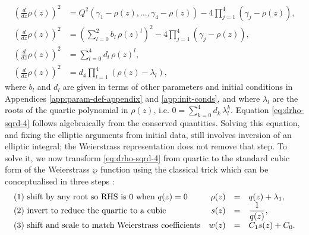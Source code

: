 \documentclass[11pt,a4paper]{article}
\numberwithin{equation}{section}
\begin{document}
\begin{align}
\left(\frac{d}{d z} \rho{\left(z \right)}\right)^{2} &= Q^{2}{\left({\gamma}_{1} - \rho{\left(z \right)}, \dots, {\gamma}_{4}  - \rho{\left(z \right)}\right)} - 4 \prod_{j=1}^{4} \left({\gamma}_{j} - \rho{\left(z \right)}\right), \label{eq:drho-sqrd-1} \\
\left(\frac{d}{d z} \rho{\left(z \right)}\right)^{2} &=  \left(\sum_{l=0}^{2}b_l\,\rho\left(z\right)^l\right)^{2} - 4 \prod_{j=1}^{4} \left({\gamma}_{j} - \rho{\left(z \right)}\right), \label{eq:drho-sqrd-2} \\
\left(\frac{d}{d z} \rho{\left(z \right)}\right)^{2} &= \sum_{l=0}^{4}d_l\,\rho\left(z\right)^l, \label{eq:drho-sqrd-3} \\
\left(\frac{d}{d z} \rho{\left(z \right)}\right)^{2} &= d_4 \prod_{l=1}^{4} \left(\rho\left(z\right) -  \lambda_l\right), \label{eq:drho-sqrd-4}
\end{align}
where $b_l$ and $d_l$ are given in terms of other parameters and initial conditions in Appendices \ref{app:param-def-appendix} and \ref{app:init-conds}, and where $\lambda_l$ are the roots of the quartic polynomial in $\rho(z)$, i.e. $0=\sum_{k=0}^{4}d_k\,\lambda_{l}^k$.
Equation \eqref{eq:drho-sqrd-4} follows algebraically from the conserved quantities.
Solving this equation, and fixing the elliptic arguments from initial data, still involves inversion of an elliptic integral; the Weierstrass representation does not remove that step.
To solve it, we now transform \eqref{eq:drho-sqrd-4} from quartic to the standard cubic form of the Weierstrass $\wp$ function using the classical trick which can be conceptualised in three steps \cite{whittakerCourseModernAnalysis2021}:
\begin{equation}
\label{eq:wp-4-to-3}
\begin{array}{l rcl}
\text{(1) shift by any root so RHS is 0 when $q(z)=0$}
& \rho(z) &=& q(z) + \lambda_1,\\
\text{(2) invert to reduce the quartic to a cubic}
& s(z) &=& \dfrac{1}{q(z)},\\
\text{(3) shift and scale to match Weierstrass coefficients}
& w(z) &=& C_1 s(z) + C_0.
\end{array}
\end{equation}
\end{document}
